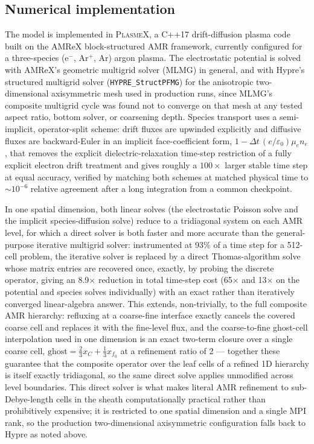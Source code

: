 \subsection{Numerical implementation}
\label{sec:methods-numerical}

The model is implemented in \textsc{PlasmeX}, a C++17 drift-diffusion
plasma code built on the AMReX block-structured AMR framework, currently
configured for a three-species (e$^-$, Ar$^+$, Ar) argon plasma. The
electrostatic potential is solved with AMReX's geometric multigrid solver
(MLMG) in general, and with Hypre's structured multigrid solver
(\texttt{HYPRE\_StructPFMG}) for the anisotropic two-dimensional
axisymmetric mesh used in production runs, since MLMG's composite
multigrid cycle was found not to converge on that mesh at any tested
aspect ratio, bottom solver, or coarsening depth. Species transport uses a
semi-implicit, operator-split scheme: drift fluxes are upwinded explicitly
and diffusive fluxes are backward-Euler in an implicit face-coefficient
form, $1 - \Delta t\,(e/\varepsilon_0)\mu_e n_e$, that removes the explicit
dielectric-relaxation time-step restriction of a fully explicit electron
drift treatment and gives roughly a $100\times$ larger stable time step at
equal accuracy, verified by matching both schemes at matched physical time
to $\sim10^{-6}$ relative agreement after a long integration from a common
checkpoint.

In one spatial dimension, both linear solves (the electrostatic Poisson
solve and the implicit species-diffusion solve) reduce to a tridiagonal
system on each AMR level, for which a direct solver is both faster and more
accurate than the general-purpose iterative multigrid solver: instrumented
at 93\% of a time step for a 512-cell problem, the iterative solver is
replaced by a direct Thomas-algorithm solve whose matrix entries are
recovered once, exactly, by probing the discrete operator, giving an
8.9$\times$ reduction in total time-step cost (65$\times$ and 13$\times$ on
the potential and species solves individually) with an exact rather than
iteratively converged linear-algebra answer. This extends, non-trivially,
to the full composite AMR hierarchy: refluxing at a coarse-fine interface
exactly cancels the covered coarse cell and replaces it with the fine-level
flux, and the coarse-to-fine ghost-cell interpolation used in one dimension
is an exact two-term closure over a single coarse cell,
$\mathrm{ghost} = \tfrac23 x_C + \tfrac13 x_{f_0}$ at a refinement ratio of
2 --- together these guarantee that the composite operator over the leaf
cells of a refined 1D hierarchy is itself exactly tridiagonal, so the same
direct solve applies unmodified across level boundaries. This direct solver
is what makes literal AMR refinement to sub-Debye-length cells in the
sheath computationally practical rather than prohibitively expensive; it is
restricted to one spatial dimension and a single MPI rank, so the
production two-dimensional axisymmetric configuration falls back to Hypre
as noted above.


